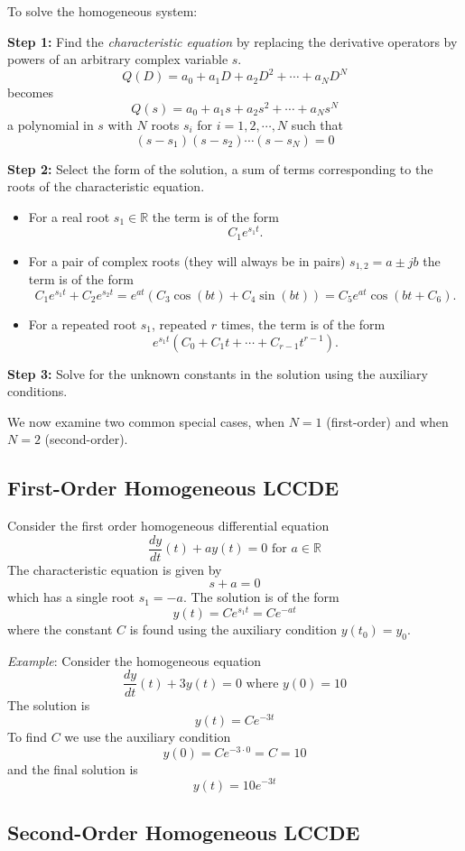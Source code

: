 To solve the homogeneous system:

\textbf{Step 1:} Find the \emph{characteristic equation} by replacing the derivative operators by powers of an arbitrary complex variable $s$.
\[
Q(D) = a_0 + a_1D + a_2D^2 + \cdots + a_ND^N
\]
becomes
\[
Q(s) = a_0 + a_1s + a_2s^2 + \cdots + a_Ns^N
\]
a polynomial in $s$ with $N$ roots $s_i$ for $i = 1, 2, \cdots, N$ such that
\[
(s - s_1)(s-s_2)\cdots(s-s_N) = 0
\]

\textbf{Step 2:} Select the form of the solution, a sum of terms corresponding to the roots of the characteristic equation.

\begin{itemize}
\item For a real root $s_1\in \mathbb{R}$ the term is of the form
  \[
  C_1 e^{s_1 t}.
  \]
\item For a pair of complex roots (they will always be in pairs) $s_{1,2} = a \pm jb$ the term is of the form
  \[
  C_1 e^{s_1 t} + C_2 e^{s_2 t} = e^{a t}\left(C_3\cos(bt) + C_4\sin(bt)\right) = C_5 e^{a t}\cos(bt + C_6).
  \]
\item For a repeated root $s_1$, repeated $r$ times, the term is of the form
  \[
  e^{s_1 t} (C_0 + C_1 t + \cdots + C_{r-1} t^{r-1}).\]
\end{itemize}

\textbf{Step 3:} Solve for the unknown constants in the solution using the auxiliary conditions. 

We now examine two common special cases, when $N=1$ (first-order) and when $N=2$ (second-order).

\subsection*{First-Order Homogeneous LCCDE}

Consider the first order homogeneous differential equation
\[
\frac{dy}{dt}(t) + ay(t) = 0 \mbox{ for } a \in \mathbb{R}
\]
The characteristic equation is given by
\[
s + a = 0
\]
which has a single root $s_1 = -a$. The solution is of the form
\[
y(t) = Ce^{s_1 t} = Ce^{-a t} 
\]
where the constant $C$ is found using the auxiliary condition $y(t_0) = y_0$.

\textit{Example}: Consider the homogeneous equation
\[
\frac{dy}{dt}(t) + 3y(t) = 0 \mbox{ where } y(0) = 10
\]
The solution is
\[
y(t) = Ce^{-3 t} 
\]
To find $C$ we use the auxiliary condition
\[
y(0) = Ce^{-3 \cdot 0} = C = 10
\]
and the final solution is
\[
y(t) = 10e^{-3 t} 
\]
\subsection*{Second-Order Homogeneous LCCDE}

